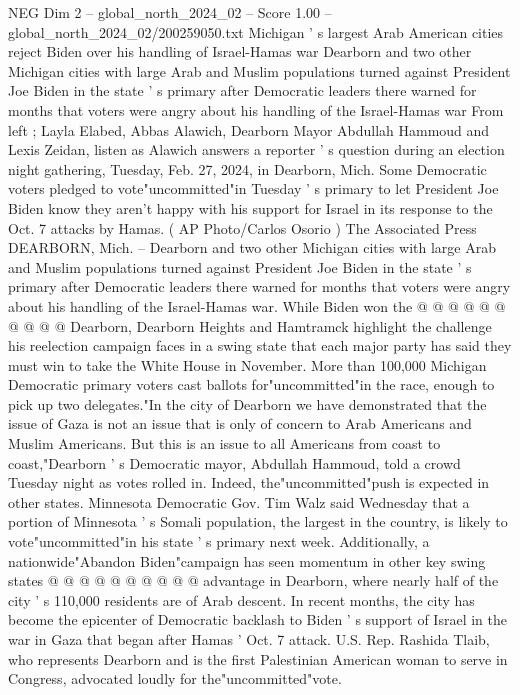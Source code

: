 \begin{textsample}{NEG Dim 2 – global\_north\_2024\_02 – Score 1.00 – global\_north\_2024\_02/200259050.txt}  \label{ex:f2_neg_177}
Michigan ' s largest Arab American cities reject Biden over his handling of Israel-Hamas war Dearborn and two other Michigan cities with large Arab and Muslim populations turned against President Joe Biden in the state ' s primary after Democratic leaders there warned for months that voters were angry about his handling of the Israel-Hamas war From left ; Layla Elabed, Abbas Alawich, Dearborn Mayor Abdullah Hammoud and Lexis Zeidan, listen as Alawich answers a reporter ' s question during an election night gathering, Tuesday, Feb. 27, 2024, in Dearborn, Mich.
Some Democratic voters pledged to vote"uncommitted"in Tuesday ' s primary to let President Joe Biden know they aren't happy with his support for Israel in its response to the Oct. 7 attacks by Hamas. ( AP Photo/Carlos Osorio ) The Associated Press DEARBORN, Mich. -- Dearborn and two other Michigan cities with large Arab and Muslim populations turned against President Joe Biden in the state ' s primary after Democratic leaders there warned for months that voters were angry about his handling of the Israel-Hamas war.
While Biden won the @ @ @ @ @ @ @ @ @ @ Dearborn, Dearborn Heights and Hamtramck highlight the challenge his reelection campaign faces in a swing state that each major party has said they must win to take the White House in November.
More than 100,000 Michigan Democratic primary voters cast ballots for"uncommitted"in the race, enough to pick up two delegates."In the city of Dearborn we have demonstrated that the issue of Gaza is not an issue that is only of concern to Arab Americans and Muslim Americans.
But this is an issue to all Americans from coast to coast,"Dearborn ' s Democratic mayor, Abdullah Hammoud, told a crowd Tuesday night as votes rolled in.
Indeed, the"uncommitted"push is expected in other states.
Minnesota Democratic Gov.
Tim Walz said Wednesday that a portion of Minnesota ' s Somali population, the largest in the country, is likely to vote"uncommitted"in his state ' s primary next week.
Additionally, a nationwide"Abandon Biden"campaign has seen momentum in other key swing states @ @ @ @ @ @ @ @ @ @ advantage in Dearborn, where nearly half of the city ' s 110,000 residents are of Arab descent.
In recent months, the city has become the epicenter of Democratic backlash to Biden ' s support of Israel in the war in Gaza that began after Hamas ' Oct. 7 attack.
U.S.
Rep.
Rashida Tlaib, who represents Dearborn and is the first Palestinian American woman to serve in Congress, advocated loudly for the"uncommitted"vote.

\end{textsample}

